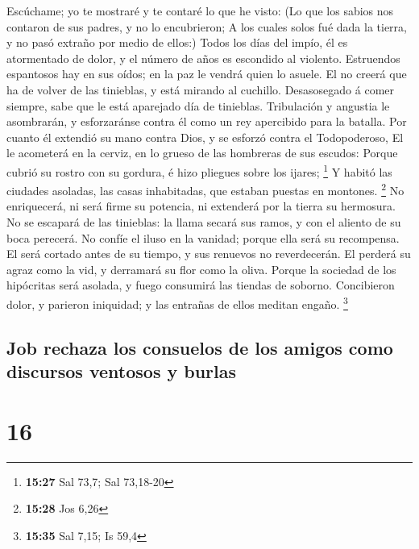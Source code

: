  Escúchame; yo te mostraré y te contaré lo que he visto:
 (Lo que los sabios nos contaron de sus padres, y no lo
encubrieron;  A los cuales solos fué dada la tierra, y no
pasó extraño por medio de ellos:)  Todos los días del
impío, él es atormentado de dolor, y el número de años es escondido al
violento.  Estruendos espantosos hay en sus oídos; en la
paz le vendrá quien lo asuele.  El no creerá que ha de
volver de las tinieblas, y está mirando al cuchillo. 
Desasosegado á comer siempre, sabe que le está aparejado día de
tinieblas.  Tribulación y angustia le asombrarán, y
esforzaránse contra él como un rey apercibido para la batalla.
 Por cuanto él extendió su mano contra Dios, y se esforzó
contra el Todopoderoso,  El le acometerá en la cerviz, en
lo grueso de las hombreras de sus escudos:  Porque cubrió
su rostro con su gordura, é hizo pliegues sobre los ijares; \footnote{\textbf{15:27}
  Sal 73,7; Sal 73,18-20}  Y habitó las ciudades asoladas,
las casas inhabitadas, que estaban puestas en montones. \footnote{\textbf{15:28}
  Jos 6,26}  No enriquecerá, ni será firme su potencia, ni
extenderá por la tierra su hermosura.  No se escapará de
las tinieblas: la llama secará sus ramos, y con el aliento de su boca
perecerá.  No confíe el iluso en la vanidad; porque ella
será su recompensa.  El será cortado antes de su tiempo, y
sus renuevos no reverdecerán.  El perderá su agraz como la
vid, y derramará su flor como la oliva.  Porque la sociedad
de los hipócritas será asolada, y fuego consumirá las tiendas de
soborno.  Concibieron dolor, y parieron iniquidad; y las
entrañas de ellos meditan engaño. \footnote{\textbf{15:35} Sal 7,15; Is
  59,4}

\hypertarget{job-rechaza-los-consuelos-de-los-amigos-como-discursos-ventosos-y-burlas}{%
\subsection{Job rechaza los consuelos de los amigos como discursos
ventosos y
burlas}\label{job-rechaza-los-consuelos-de-los-amigos-como-discursos-ventosos-y-burlas}}

\hypertarget{section-15}{%
\section{16}\label{section-15}}

